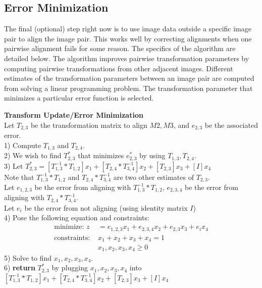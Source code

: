 \documentclass{article}
\begin{document}
\subsection{Error Minimization}
The final (optional) step right now is to use image data outside a specific image pair to align the image pair. This works well by correcting alignments when one pairwise alignment fails for some reason. The specifics of the algorithm are detailed below. The algorithm improves pairwise transformation parameters by computing pairwise transformations from other adjacent images. Different estimates of the transformation parameters between an image pair are computed from solving a linear programming problem. The transformation parameter that minimizes a particular error function is selected.
	\begin{algorithm}
	\DontPrintSemicolon
	\textbf{Transform Update/Error Minimization}\\
	Let $T_{2,3}$ be the transformation matrix to align $M2, M3$, and $e_{2,3}$ be the associated error.\\
	1) Compute $T_{1,3}$ and $T_{2,4}$.\\
	2) We wish to find $T_{2,3}^{*}$ that minimizes $e_{2,3}^{*}$ by using $T_{1,3},T_{2,4}$.\\
	3) Let $T_{2,3}^{*} = [T_{1,3}^{-1}*T_{1,2}]x_1 + [T_{2,4}*T_{3,4}^{-1}]x_2 + [T_{2,3}]x_3 + [I]x_4$\\
	Note that $T_{1,3}^{-1}*T_{1,2}$ and $T_{2,4}*T_{3,4}^{-1}$ are two other estimates of $T_{2,3}$.\\
	Let $e_{1,2,3}$ be the error from aligning with $T_{1,3}^{-1}*T_{1,2}$, $e_{2,3,4}$ be the error from aligning with $T_{2,4}*T_{3,4}^{-1}$.\\
	Let $e_i$ be the error from not aligning (using identity matrix $I$) \\
 	4) Pose the following equation and constraints:
	\begin{align*}
	 \text{minimize: } z &= e_{1,2,3}x_1 +  e_{2,3,4}x_2 + e_{2,3}x_3 + e_ix_4\\
	 \text{constraints: }&x_1 + x_2 + x_3 + x_4 = 1\\
	 &x_1, x_2, x_3, x_4 \ge 0
	\end{align*}
	5) Solve to find $x_1, x_2, x_3, x_4$.\\
	6) \textbf{return} $T_{2,3}^{*}$ by plugging $x_1, x_2, x_3, x_4$ into $[T_{1,3}^{-1}*T_{1,2}]x_1 + [T_{2,4}*T_{3,4}^{-1}]x_2 + [T_{2,3}]x_3 + [I]x_4$
	\end{algorithm}
\end{document}
